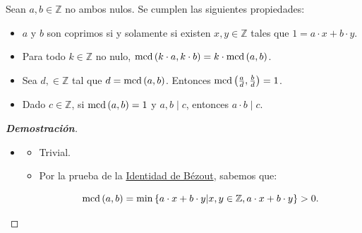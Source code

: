 \begin{proposition}
  \rm Sean $a,b\in\mathbb{Z}$ no ambos nulos. Se cumplen las siguientes propiedades:

  \begin{itemize}
    \item[1.] $a$ y $b$ son coprimos si y solamente si existen $x,y\in\mathbb{Z}$ tales que $1=a\cdot x+b\cdot y$.
    \item[2.] Para todo $k\in\mathbb{Z}$ no nulo, $\text{mcd}\left(k\cdot a,k\cdot b\right)=k\cdot\text{mcd}\left(a,b\right)$.
    \item[3.] Sea $d,\in\mathbb{Z}$ tal que $d=\text{mcd}\left(a,b\right)$. Entonces $\text{mcd}\left(\frac{a}{d},\frac{b}{d}\right)=1$.
    \item[4.] Dado $c\in\mathbb{Z}$, si $\text{mcd}\left(a,b\right)=1$ y $a,b\mid c$, entonces $a\cdot b\mid c$.
  \end{itemize}
  \begin{proof}[\rm\textbf{Demostración}]
    \hfill
    \begin{itemize}
      \item[1.] \begin{itemize}
        \item[\boxed{\Rightarrow}] Trivial.
        \item[\boxed{\Leftarrow}] Por la prueba de la \hyperref[Identidad de Bézout]{Identidad de Bézout}, sabemos que:
        
        \begin{equation}
          \text{mcd}\left(a,b\right)=\min\left\{a\cdot x+b\cdot y\middle|x,y\in\mathbb{Z},a\cdot x+b\cdot y\right\}>0.
        \end{equation}


\end{itemize}
\end{itemize}
\end{proof}
\end{proposition}
